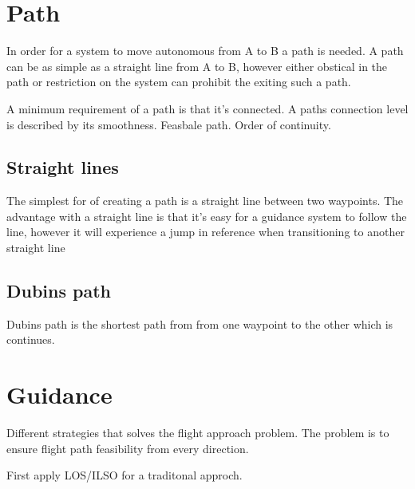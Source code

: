 \section{Path}
In order for a system to move autonomous from A to B a path is needed. A path can be as simple as a straight line from A to B, however either obstical in the path or restriction on the system can prohibit the exiting such a path.

A minimum requirement of a path is that it's connected. A paths connection level is described by its smoothness.
Feasbale path. Order of continuity.

\subsection{Straight lines}
The simplest for of creating a path is a straight line between two waypoints. The advantage with a straight line is that it's easy for a guidance system to follow the line, however it will experience a jump in reference when transitioning to another straight line
\subsection{Dubins path}
Dubins path is the shortest path from from one waypoint to the other which is continues.
\section{Guidance}
Different strategies that solves the flight approach problem. The problem is to ensure flight path feasibility from every direction.

First apply LOS/ILSO for a traditonal approch. 